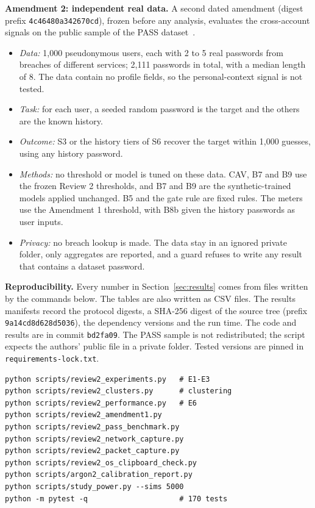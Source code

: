 \documentclass[preprint,12pt]{elsarticle}
\begin{document}
\textbf{Amendment 2: independent real data.} A second dated amendment (digest prefix \texttt{4c46480a342670cd}), frozen before any analysis, evaluates the cross-account signals on the public sample of the PASS dataset~\cite{pass}.
\begin{itemize}
\item \emph{Data:} 1,000 pseudonymous users, each with 2 to 5 real passwords from breaches of different services; 2,111 passwords in total, with a median length of 8. The data contain no profile fields, so the personal-context signal is not tested.
\item \emph{Task:} for each user, a seeded random password is the target and the others are the known history.
\item \emph{Outcome:} S3 or the history tiers of S6 recover the target within 1,000 guesses, using any history password.
\item \emph{Methods:} no threshold or model is tuned on these data. CAV, B7 and B9 use the frozen Review 2 thresholds, and B7 and B9 are the synthetic-trained models applied unchanged. B5 and the gate rule are fixed rules. The meters use the Amendment 1 threshold, with B8b given the history passwords as user inputs.
\item \emph{Privacy:} no breach lookup is made. The data stay in an ignored private folder, only aggregates are reported, and a guard refuses to write any result that contains a dataset password.
\end{itemize}

\textbf{Reproducibility.} Every number in Section~\ref{sec:results} comes from files written by the commands below. The tables are also written as CSV files. The results manifests record the protocol digests, a SHA-256 digest of the source tree (prefix \texttt{9a14cd8d628d5036}), the dependency versions and the run time. The code and results are in commit \texttt{bd2fa09}. The PASS sample is not redistributed; the script expects the authors' public file in a private folder. Tested versions are pinned in \texttt{requirements-lock.txt}.
{\footnotesize
\begin{verbatim}
python scripts/review2_experiments.py   # E1-E3
python scripts/review2_clusters.py      # clustering
python scripts/review2_performance.py   # E6
python scripts/review2_amendment1.py
python scripts/review2_pass_benchmark.py
python scripts/review2_network_capture.py
python scripts/review2_packet_capture.py
python scripts/review2_os_clipboard_check.py
python scripts/argon2_calibration_report.py
python scripts/study_power.py --sims 5000
python -m pytest -q                     # 170 tests
\end{verbatim}}
\end{document}
